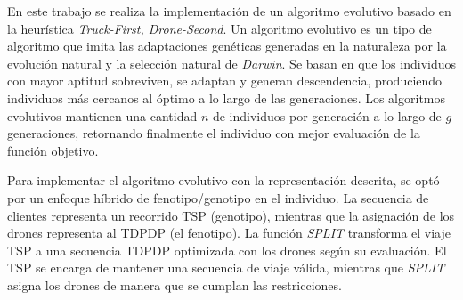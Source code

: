

En este trabajo se realiza la implementación de un algoritmo evolutivo basado en la heurística \textit{Truck-First, Drone-Second}. 
Un algoritmo evolutivo es un tipo de algoritmo que imita las adaptaciones genéticas generadas en la naturaleza por la evolución natural y la selección natural de \textit{Darwin}. Se basan en que los individuos con mayor aptitud sobreviven, se adaptan y generan descendencia, produciendo individuos más cercanos al óptimo a lo largo de las generaciones. 
Los algoritmos evolutivos mantienen una cantidad $n$ de individuos por generación a lo largo de $g$ generaciones, retornando finalmente el individuo con mejor evaluación de la función objetivo.

Para implementar el algoritmo evolutivo con la representación descrita, se optó por un enfoque híbrido de fenotipo/genotipo en el individuo. La secuencia de clientes representa un recorrido TSP (genotipo), mientras que la asignación de los drones representa al TDPDP (el fenotipo). La función \textit{SPLIT} transforma el viaje TSP a una secuencia TDPDP optimizada con los drones según su evaluación. El TSP se encarga de mantener una secuencia de viaje válida, mientras que \textit{SPLIT} asigna los drones de manera que se cumplan las restricciones.

